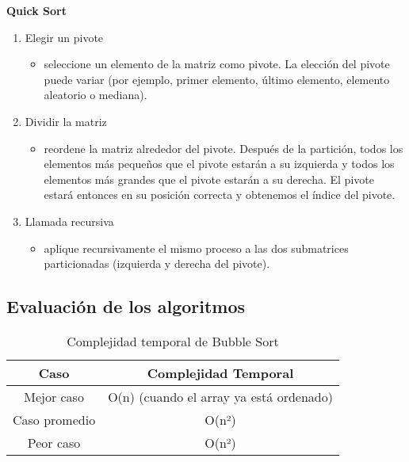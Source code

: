 \textbf{
Quick Sort
}
\begin{enumerate}
    \item Elegir un pivote
    \begin{itemize}
    \item seleccione un elemento de la matriz como pivote. La elección del pivote puede variar (por ejemplo, primer elemento, último elemento, elemento aleatorio o mediana).
    \end{itemize}

    \item Dividir la matriz
    \begin{itemize}
    \item reordene la matriz alrededor del pivote. Después de la partición, todos los elementos más pequeños que el pivote estarán a su izquierda y todos los elementos más grandes que el pivote estarán a su derecha. El pivote estará entonces en su posición correcta y obtenemos el índice del pivote.
    \end{itemize}

    \item Llamada recursiva
    \begin{itemize}
    \item aplique recursivamente el mismo proceso a las dos submatrices particionadas (izquierda y derecha del pivote).
    \end{itemize}
\end{enumerate}

\vspace{5cm}
\subsection{Evaluación de los algoritmos}


\begin{table}[htbp]
    \centering
    \small %
    \begin{tabular}{|c|c|}
        \hline
        \textbf{Caso} & \textbf{Complejidad Temporal} \\
        \hline
        Mejor caso & O(n) (cuando el array ya está ordenado) \\
        \hline
        Caso promedio & O(n²) \\
        \hline
        Peor caso & O(n²) \\
        \hline
    \end{tabular}
    \caption{Complejidad temporal de Bubble Sort}
    \label{tab:complejidad}
\end{table}



